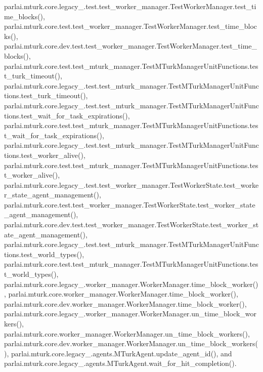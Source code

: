 parlai.\+mturk.\+core.\+legacy\+\_.\+test.\+test\+\_\+worker\+\_\+manager.\+Test\+Worker\+Manager.\+test\+\_\+time\+\_\+blocks(), parlai.\+mturk.\+core.\+test.\+test\+\_\+worker\+\_\+manager.\+Test\+Worker\+Manager.\+test\+\_\+time\+\_\+blocks(), parlai.\+mturk.\+core.\+dev.\+test.\+test\+\_\+worker\+\_\+manager.\+Test\+Worker\+Manager.\+test\+\_\+time\+\_\+blocks(), parlai.\+mturk.\+core.\+test.\+test\+\_\+mturk\+\_\+manager.\+Test\+M\+Turk\+Manager\+Unit\+Functions.\+test\+\_\+turk\+\_\+timeout(), parlai.\+mturk.\+core.\+legacy\+\_.\+test.\+test\+\_\+mturk\+\_\+manager.\+Test\+M\+Turk\+Manager\+Unit\+Functions.\+test\+\_\+turk\+\_\+timeout(), parlai.\+mturk.\+core.\+legacy\+\_.\+test.\+test\+\_\+mturk\+\_\+manager.\+Test\+M\+Turk\+Manager\+Unit\+Functions.\+test\+\_\+wait\+\_\+for\+\_\+task\+\_\+expirations(), parlai.\+mturk.\+core.\+test.\+test\+\_\+mturk\+\_\+manager.\+Test\+M\+Turk\+Manager\+Unit\+Functions.\+test\+\_\+wait\+\_\+for\+\_\+task\+\_\+expirations(), parlai.\+mturk.\+core.\+legacy\+\_.\+test.\+test\+\_\+mturk\+\_\+manager.\+Test\+M\+Turk\+Manager\+Unit\+Functions.\+test\+\_\+worker\+\_\+alive(), parlai.\+mturk.\+core.\+test.\+test\+\_\+mturk\+\_\+manager.\+Test\+M\+Turk\+Manager\+Unit\+Functions.\+test\+\_\+worker\+\_\+alive(), parlai.\+mturk.\+core.\+legacy\+\_.\+test.\+test\+\_\+worker\+\_\+manager.\+Test\+Worker\+State.\+test\+\_\+worker\+\_\+state\+\_\+agent\+\_\+management(), parlai.\+mturk.\+core.\+test.\+test\+\_\+worker\+\_\+manager.\+Test\+Worker\+State.\+test\+\_\+worker\+\_\+state\+\_\+agent\+\_\+management(), parlai.\+mturk.\+core.\+dev.\+test.\+test\+\_\+worker\+\_\+manager.\+Test\+Worker\+State.\+test\+\_\+worker\+\_\+state\+\_\+agent\+\_\+management(), parlai.\+mturk.\+core.\+legacy\+\_.\+test.\+test\+\_\+mturk\+\_\+manager.\+Test\+M\+Turk\+Manager\+Unit\+Functions.\+test\+\_\+world\+\_\+types(), parlai.\+mturk.\+core.\+test.\+test\+\_\+mturk\+\_\+manager.\+Test\+M\+Turk\+Manager\+Unit\+Functions.\+test\+\_\+world\+\_\+types(), parlai.\+mturk.\+core.\+legacy\+\_.\+worker\+\_\+manager.\+Worker\+Manager.\+time\+\_\+block\+\_\+worker(), parlai.\+mturk.\+core.\+worker\+\_\+manager.\+Worker\+Manager.\+time\+\_\+block\+\_\+worker(), parlai.\+mturk.\+core.\+dev.\+worker\+\_\+manager.\+Worker\+Manager.\+time\+\_\+block\+\_\+worker(), parlai.\+mturk.\+core.\+legacy\+\_.\+worker\+\_\+manager.\+Worker\+Manager.\+un\+\_\+time\+\_\+block\+\_\+workers(), parlai.\+mturk.\+core.\+worker\+\_\+manager.\+Worker\+Manager.\+un\+\_\+time\+\_\+block\+\_\+workers(), parlai.\+mturk.\+core.\+dev.\+worker\+\_\+manager.\+Worker\+Manager.\+un\+\_\+time\+\_\+block\+\_\+workers(), parlai.\+mturk.\+core.\+legacy\+\_.\+agents.\+M\+Turk\+Agent.\+update\+\_\+agent\+\_\+id(), and parlai.\+mturk.\+core.\+legacy\+\_.\+agents.\+M\+Turk\+Agent.\+wait\+\_\+for\+\_\+hit\+\_\+completion().

